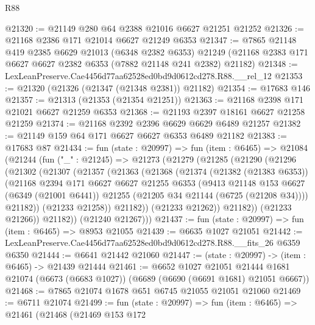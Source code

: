 \begin{lexlean}{R88}
\begin{coremodule}
@21320 := @21149 @280 @64 @2388 @21016 @6627 @21251 @21252
@21326 := @21168 @2386 @171 @21014 @6627 @21249 @6353
@21347 := @7865
    @21148
    @419
    @2385
    @6629
    @21013
    (@6348 @2382 @6353)
    @21249
    (@21168 @2383 @171 @6627 @6627 @2382 @6353 (@7882 @21148 @241 @2382) @21182)
@21348 := LexLeanPreserve.Cae4456d77aa62528ed0bd9d0612cd278.R88.__rel_12
@21353 := @21320 (@21326 (@21347 (@21348 @2381)) @21182)
@21354 := @17683 @146
@21357 := @21313 (@21353 (@21354 @21251))
@21363 := @21168 @2398 @171 @21021 @6627 @21259 @6353
@21368 := @21193 @2397 @18161 @6627 @21258 @21259
@21374 := @21168 @2392 @2396 @6629 @6629 @6489 @21257
@21382 := @21149 @159 @64 @171 @6627 @6627 @6353 @6489 @21182
@21383 := @17683 @87
@21434 := fun (state : @20997) =>
  fun (item : @6465) =>
  @21084
    (@21244
      (fun ("_" : @21245) =>
      @21273
        (@21279
          (@21285
            (@21290
              (@21296
                (@21302
                  (@21307
                    (@21357
                      (@21363
                        (@21368
                          (@21374
                            (@21382 (@21383 @6353))
                            (@21168
                              @2394
                              @171
                              @6627
                              @6627
                              @21255
                              @6353
                              (@9413
                                @21148
                                @153
                                @6627
                                (@6349 (@21001 @6441))
                                @21255
                                (@21205 @34 @21144 (@6725 (@21208 @34))))
                              @21182))
                          (@21233 @21258))
                        @21182))
                    (@21233 @21262))
                  @21182))
              (@21233 @21266))
            @21182))
        (@21240 @21267)))
@21437 := fun (state : @20997) => fun (item : @6465) => @8953 @21055
@21439 := @6635 @1027 @21051
@21442 := LexLeanPreserve.Cae4456d77aa62528ed0bd9d0612cd278.R88.__fits_26 @6359 @6350
@21444 := @6641 @21442 @21060
@21447 := (state : @20997) -> (item : @6465) -> @21439 @21444
@21461 := @6652
    @1027
    @21051
    @21444
    @1681
    @21074
    (@6673 (@6683 @1027))
    (@6689 (@6690 (@6691 @1681) @21051 @6667))
@21468 := @7865 @21074 @1678 @651 @6745 @21055 @21051 @21060
@21469 := @6711 @21074
@21499 := fun (state : @20997) =>
  fun (item : @6465) =>
  @21461
    (@21468
      (@21469
        @153
        @172

\end{coremodule}
\end{lexlean}
